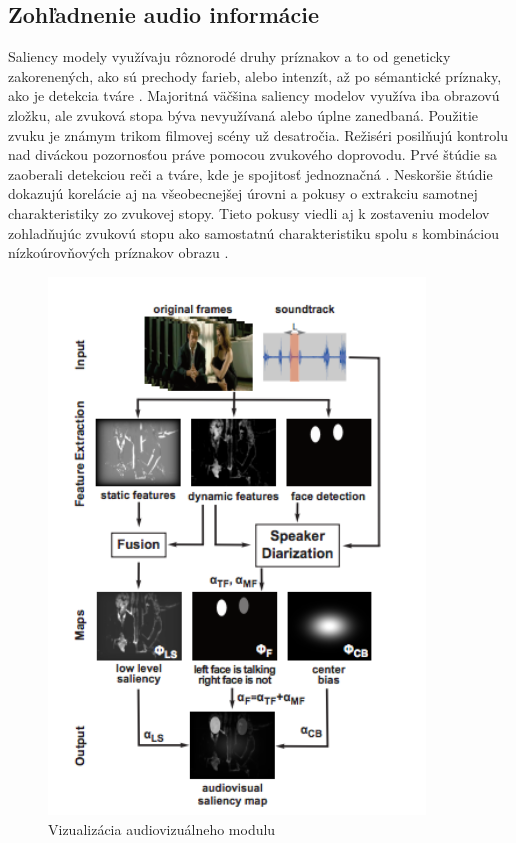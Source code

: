 \subsection{Zohľadnenie audio informácie}
Saliency modely využívaju rôznorodé druhy príznakov a to od geneticky zakorenených, ako sú prechody farieb, alebo intenzít, až po sémantické príznaky, ako je detekcia tváre \cite{salient-faces}.
Majoritná väčšina saliency modelov využíva iba obrazovú zložku, ale zvuková stopa býva nevyužívaná alebo úplne zanedbaná.
Použitie zvuku je známym trikom filmovej scény už desatročia.
Režiséri posilňujú kontrolu nad diváckou pozornosťou práve pomocou zvukového doprovodu.
Prvé štúdie sa zaoberali detekciou reči a tváre, kde je spojitosť jednoznačná \cite{sound-1}.
Neskoršie štúdie dokazujú korelácie aj na všeobecnejšej úrovni a pokusy o extrakciu samotnej charakteristiky zo zvukovej stopy\cite{sound-coutrot-1}.
Tieto pokusy viedli aj k zostaveniu modelov zohladňujúc zvukovú stopu ako samostatnú charakteristiku spolu s kombináciou nízkoúrovňových príznakov obrazu \cite{sound-courot-2}.

\begin{figure}[H]
  \centering
  \includegraphics[width=10cm]{pics/courot-1.png}
  \caption{Vizualizácia audiovizuálneho modulu\cite{sound-courot-2}}\label{wrap-fig:4}
\end{figure}
\vspace{10mm}

